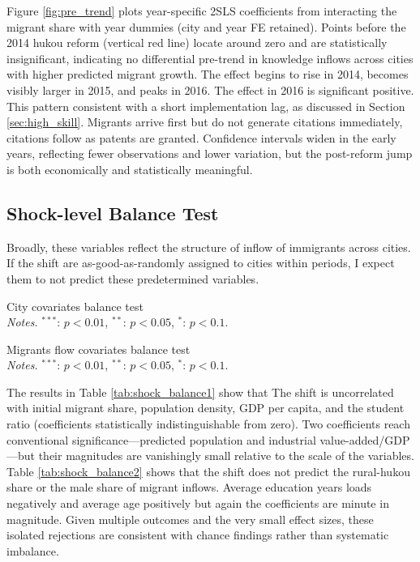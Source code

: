 \documentclass[12pt]{article}
\begin{document}
Figure \ref{fig:pre_trend} plots year-specific 2SLS coefficients from interacting the migrant share with year dummies (city and year FE retained). Points before the 2014 hukou reform (vertical red line) locate around zero and are statistically insignificant, indicating no differential pre-trend in knowledge inflows across cities with higher predicted migrant growth. The effect begins to rise in 2014, becomes visibly larger in 2015, and peaks in 2016. The effect in 2016 is significant positive. This pattern consistent with a short implementation lag, as discussed in Section \ref{sec:high_skill}. Migrants arrive first but do not generate citations immediately, citations follow as patents are granted. Confidence intervals widen in the early years, reflecting fewer observations and lower variation, but the post-reform jump is both economically and statistically meaningful.

\subsection{Shock-level Balance Test}

Broadly, these variables reflect the structure of inflow of immigrants across cities. If the shift are as-good-as-randomly assigned to cities within periods, I expect them to not predict these predetermined variables.

\begin{table}[h]
 \centering 
 \resizebox{\textwidth}{!}{}
 \caption{City covariates balance test \vspace{1ex} \\ 
 {\footnotesize \emph{Notes.} $^{***}$: $p < 0.01$, $^{**}$: $p < 0.05$, $^{*}$: $p < 0.1$.}}
\label{tab:shock_balance1}
\end{table}
\begin{table}[h]
 \centering 
 \resizebox{\textwidth}{!}{
   
 }
 \caption{Migrants flow covariates balance test \vspace{1ex} \\ 
 {\footnotesize \emph{Notes.} $^{***}$: $p < 0.01$, $^{**}$: $p < 0.05$, $^{*}$: $p < 0.1$.}}
\label{tab:shock_balance2}
\end{table}

The results in Table \ref{tab:shock_balance1} show that The shift is uncorrelated with initial migrant share, population density, GDP per capita, and the student ratio (coefficients statistically indistinguishable from zero).
Two coefficients reach conventional significance—predicted population and industrial value-added/GDP—but their magnitudes are vanishingly small relative to the scale of the variables. 
Table \ref{tab:shock_balance2} shows that the shift does not predict the rural-hukou share or the male share of migrant inflows. Average education years loads negatively and average age positively but again the coefficients are minute in magnitude. Given multiple outcomes and the very small effect sizes, these isolated rejections are consistent with chance findings rather than systematic imbalance.
\end{document}
